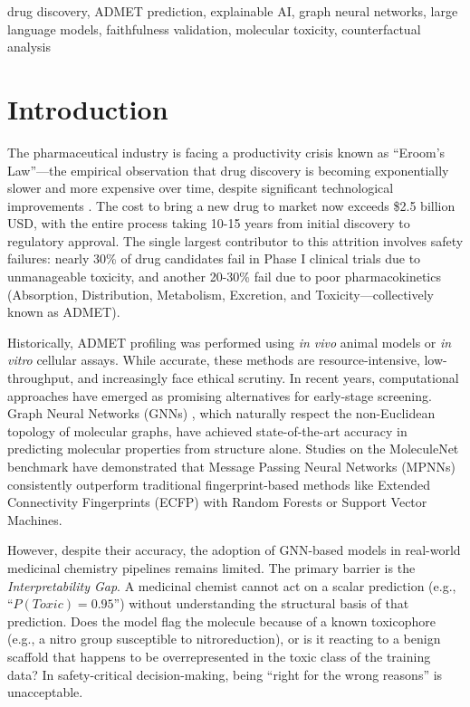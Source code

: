 \documentclass[conference]{IEEEtran}
\begin{document}
\begin{IEEEkeywords}
drug discovery, ADMET prediction, explainable AI, graph neural networks, large language models, faithfulness validation, molecular toxicity, counterfactual analysis
\end{IEEEkeywords}

\section{Introduction}

The pharmaceutical industry is facing a productivity crisis known as ``Eroom's Law''---the empirical observation that drug discovery is becoming exponentially slower and more expensive over time, despite significant technological improvements \cite{scannell2012diagnosing}. The cost to bring a new drug to market now exceeds \$2.5 billion USD, with the entire process taking 10-15 years from initial discovery to regulatory approval. The single largest contributor to this attrition involves safety failures: nearly 30\% of drug candidates fail in Phase I clinical trials due to unmanageable toxicity, and another 20-30\% fail due to poor pharmacokinetics (Absorption, Distribution, Metabolism, Excretion, and Toxicity---collectively known as ADMET).

Historically, ADMET profiling was performed using \textit{in vivo} animal models or \textit{in vitro} cellular assays. While accurate, these methods are resource-intensive, low-throughput, and increasingly face ethical scrutiny. In recent years, computational approaches have emerged as promising alternatives for early-stage screening. Graph Neural Networks (GNNs) \cite{xu2019powerful, gilmer2017neural}, which naturally respect the non-Euclidean topology of molecular graphs, have achieved state-of-the-art accuracy in predicting molecular properties from structure alone. Studies on the MoleculeNet benchmark \cite{wu2018moleculenet} have demonstrated that Message Passing Neural Networks (MPNNs) consistently outperform traditional fingerprint-based methods like Extended Connectivity Fingerprints (ECFP) with Random Forests or Support Vector Machines.

However, despite their accuracy, the adoption of GNN-based models in real-world medicinal chemistry pipelines remains limited. The primary barrier is the \textit{Interpretability Gap}. A medicinal chemist cannot act on a scalar prediction (e.g., ``$P(Toxic) = 0.95$'') without understanding the structural basis of that prediction. Does the model flag the molecule because of a known toxicophore (e.g., a nitro group susceptible to nitroreduction), or is it reacting to a benign scaffold that happens to be overrepresented in the toxic class of the training data? In safety-critical decision-making, being ``right for the wrong reasons'' is unacceptable.
\end{document}
